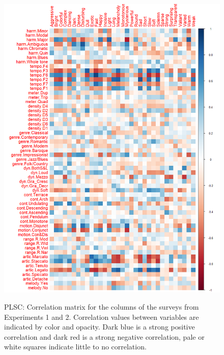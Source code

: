 \documentclass[
]{article}
\begin{document}
\begin{figure}[H]   
  \centering  
  \caption{PLSC: Correlation matrix for the columns of the surveys from Experiments 1 and 2. Correlation values between variables are indicated by color and opacity. Dark blue is a strong positive correlation and dark red is a strong negative correlation, pale or white squares indicate little to no correlation.}
    \includegraphics[width=\textwidth]{./supmatsimgs/pcorrplot.png}
  \label{fig:pcorr}
\end{figure}
\end{document}
